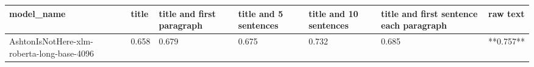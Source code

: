\begin{tabular}{lllllll}
\toprule
                                model\_name & title & title and first paragraph & title and 5 sentences & title and 10 sentences & title and first sentence each paragraph &  raw text \\
\midrule
AshtonIsNotHere-xlm-roberta-long-base-4096 & 0.658 &                     0.679 &                 0.675 &                  0.732 &                                   0.685 & **0.757** \\
\bottomrule
\end{tabular}
